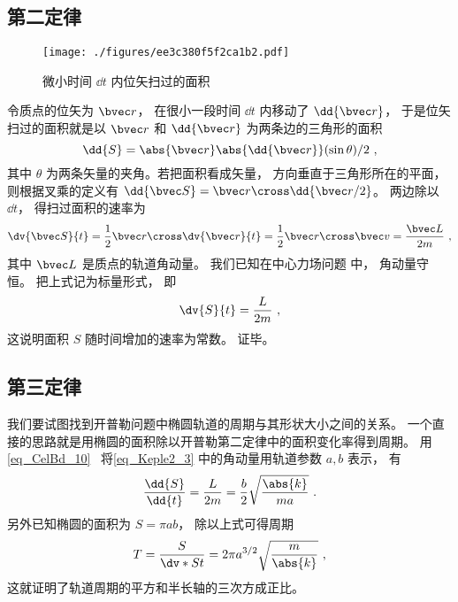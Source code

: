 

\subsection{第二定律}
\begin{figure}[ht]
\centering
\texttt{[image: ./figures/ee3c380f5f2ca1b2.pdf]}
\caption{微小时间 $\dd{t}$ 内位矢扫过的面积} \label{fig_Keple2_1}
\end{figure}

令质点的位矢为 $\bvec r$，  在很小一段时间 $\dd{t}$ 内移动了 $\dd{\bvec r}$，  于是位矢扫过的面积就是以 $\bvec r$ 和 $\dd{\bvec r}$ 为两条边的三角形的面积
\begin{equation}
\dd{S} = \abs{\bvec r} \abs{\dd{\bvec r}} (\sin \theta) /2~,
\end{equation}
其中 $\theta$ 为两条矢量的夹角。若把面积看成矢量， 方向垂直于三角形所在的平面， 则根据叉乘的定义有 $\dd{\bvec S} = \bvec r \cross \dd{\bvec r/2}$。 两边除以 $\dd{t}$，  得扫过面积的速率为
\begin{equation}
\dv{\bvec S}{t} = \frac12 \bvec r \cross \dv{\bvec r}{t} = \frac12 \bvec r\cross \bvec v = \frac{\bvec L}{2m}~,
\end{equation}
其中 $\bvec L$ 是质点的轨道角动量。 我们已知在中心力场问题 中， 角动量守恒。 把上式记为标量形式， 即
\begin{equation}\label{eq_Keple2_3}
\dv{S}{t} = \frac{L}{2m}~,
\end{equation}
这说明面积 $S$ 随时间增加的速率为常数。 证毕。

\subsection{第三定律}
我们要试图找到开普勒问题中椭圆轨道的周期与其形状大小之间的关系。 一个直接的思路就是用椭圆的面积除以开普勒第二定律中的面积变化率得到周期。 用\autoref{eq_CelBd_10}~ 将\autoref{eq_Keple2_3} 中的角动量用轨道参数 $a,b$ 表示， 有
\begin{equation}
\frac{\dd{S}}{\dd{t}} = \frac{L}{2m} = \frac b2 \sqrt{\frac{\abs{k}}{ma}}~.
\end{equation}
另外已知椭圆的面积为 $S = \pi ab$， 除以上式可得周期
\begin{equation}\label{eq_Keple2_1}
T = \frac{S}{\dv*{S}{t}} = 2\pi a^{3/2} \sqrt{\frac{m}{\abs{k}}}~,
\end{equation}
这就证明了轨道周期的平方和半长轴的三次方成正比。

